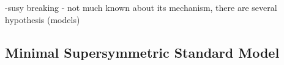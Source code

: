 
-susy breaking - not much known about its mechanism, there are several hypothesis (models)


\subsection{Minimal Supersymmetric Standard Model}

